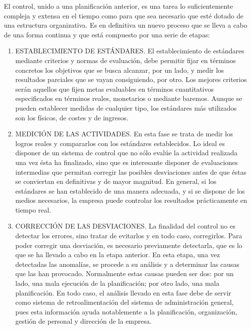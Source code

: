 \documentclass[
]{krantz}
\providecommand{\tightlist}{%
  \setlength{\itemsep}{0pt}\setlength{\parskip}{0pt}}
\begin{document}
El control, unido a una planificación anterior, es una tarea lo suficientemente compleja y extensa en el tiempo como para que sea necesario que esté dotado de una estructura organizativa. Es en definitiva un nuevo proceso que se lleva a cabo de una forma continua y que está compuesto por una serie de etapas:

\begin{enumerate}
\def\labelenumi{\arabic{enumi}.}
\tightlist
\item
  ESTABLECIMIENTO DE ESTÁNDARES. El establecimiento de estándares mediante criterios y normas de evaluación, debe permitir fijar en términos concretos los objetivos que se busca alcanzar, por un lado, y medir los resultados parciales que se vayan consiguiendo, por otro. Los mejores criterios serán aquellos que fijen metas evaluables en términos cuantitativos especificados en términos reales, monetarios o mediante baremos. Aunque se pueden establecer medidas de cualquier tipo, los estándares más utilizados son los físicos, de costes y de ingresos.
\item
  MEDICIÓN DE LAS ACTIVIDADES. En esta fase se trata de medir los logros reales y compararlos con los estándares establecidos. Lo ideal es disponer de un sistema de control que no sólo evalúe la actividad realizada una vez ésta ha finalizado, sino que es interesante disponer de evaluaciones intermedias que permitan corregir las posibles desviaciones antes de que éstas se conviertan en definitivas y de mayor magnitud. En general, si los estándares se han establecido de una manera adecuada, y si se dispone de los medios necesarios, la empresa puede controlar los resultados prácticamente en tiempo real.
\item
  CORRECCIÓN DE LAS DESVIACIONES. La finalidad del control no es detectar los errores, sino tratar de evitarlos y en todo caso, corregirlos. Para poder corregir una desviación, es necesario previamente detectarla, que es lo que se ha llevado a cabo en la etapa anterior. En esta etapa, una vez detectadas las anomalías, se procede a su análisis y a determinar las causas que las han provocado. Normalmente estas causas pueden ser dos: por un lado, una mala ejecución de la planificación; por otro lado, una mala planificación. En todo caso, el análisis llevado en esta fase debe de servir como sistema de retroalimentación del sistema de administración general, pues esta información ayuda notablemente a la planificación, organización, gestión de personal y dirección de la empresa.
\end{enumerate}
\end{document}
